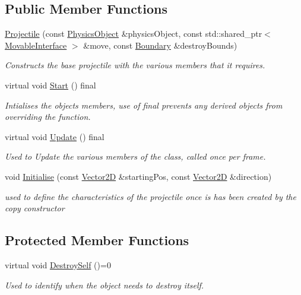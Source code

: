 \subsection*{Public Member Functions}
\begin{DoxyCompactItemize}
\item 
\hyperlink{class_projectile_a4ff1ec79a15e7821ac5ccfd6dda9205f}{Projectile} (const \hyperlink{class_physics_object}{Physics\+Object} \&physics\+Object, const std\+::shared\+\_\+ptr$<$ \hyperlink{class_movable_interface}{Movable\+Interface} $>$ \&move, const \hyperlink{class_boundary}{Boundary} \&destroy\+Bounds)
\begin{DoxyCompactList}\small\item\em Constructs the base projectile with the various members that it requires. \end{DoxyCompactList}\item 
\mbox{\label{class_projectile_a27a59059730a66a37feec766ebe08fa2}} 
virtual void \hyperlink{class_projectile_a27a59059730a66a37feec766ebe08fa2}{Start} () final
\begin{DoxyCompactList}\small\item\em Intialises the objects members, use of final prevents any derived objects from overriding the function. \end{DoxyCompactList}\item 
virtual void \hyperlink{class_projectile_a1f9df5dd65fed410d4e897eb63edc1c9}{Update} () final
\begin{DoxyCompactList}\small\item\em Used to Update the various members of the class, called once per frame. \end{DoxyCompactList}\item 
void \hyperlink{class_projectile_a8c1501698a272f3ae0def6bdc6b3d763}{Initialise} (const \hyperlink{class_vector2_d}{Vector2D} \&starting\+Pos, const \hyperlink{class_vector2_d}{Vector2D} \&direction)
\begin{DoxyCompactList}\small\item\em used to define the characteristics of the projectile once is has been created by the copy constructor \end{DoxyCompactList}\end{DoxyCompactItemize}
\subsection*{Protected Member Functions}
\begin{DoxyCompactItemize}
\item 
virtual void \hyperlink{class_projectile_ab2f4025b6f9b5caa20e0a4c5c248d603}{Destroy\+Self} ()=0
\begin{DoxyCompactList}\small\item\em Used to identify when the object needs to destroy itself. \end{DoxyCompactList}\end{DoxyCompactItemize}
